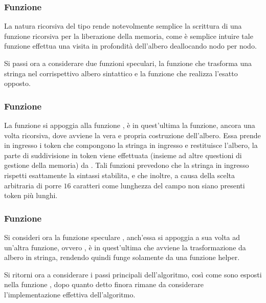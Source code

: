 \documentclass[11pt,letterpaper,twoside]{article}
\begin{document}
\subsubsection{Funzione } 

La natura ricorsiva del tipo  rende notevolmente semplice
la scrittura di una funzione ricorsiva per la liberazione della memoria, come è
semplice intuire tale funzione effettua una visita in profondità dell'albero
deallocando nodo per nodo.

Si passi ora a considerare due funzioni speculari, la funzione
 che trasforma una stringa nel
corrispettivo albero sintattico e la funzione  che realizza l'esatto opposto.

\subsubsection{Funzione } 

La funzione  si appoggia alla funzione , è in
quest'ultima la funzione, ancora una volta ricorsiva, dove avviene la vera e
propria costruzione dell'albero. Essa prende in ingresso i token che compongono
la stringa in ingresso e restituisce l'albero, la parte di suddivisione in token
viene effettuata (insieme ad altre questioni di gestione della memoria) da
. Tali funzioni prevedono che la stringa in ingresso rispetti
esattamente la sintassi stabilita, e che inoltre, a causa della scelta
arbitraria di porre $16$ caratteri come lunghezza del campo 
non siano presenti token più lunghi.

\subsubsection{Funzione } 

Si consideri ora la funzione speculare , anch'essa si appoggia
a sua volta ad un'altra funzione, ovvero , è in
quest'ultima che avviene la trasformazione da albero in stringa, rendendo quindi
 funge solamente da una funzione helper.


Si ritorni ora a considerare i passi principali dell'algoritmo, così come sono
esposti nella funzione , dopo quanto detto finora rimane da
considerare l'implementazione effettiva dell'algoritmo.
\end{document}
